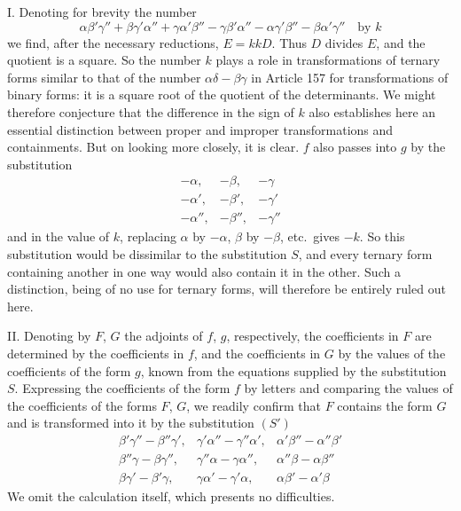 I. Denoting for brevity the number
\[
\alpha\beta'\gamma''+\beta\gamma'\alpha''+\gamma\alpha'\beta''
-\gamma\beta'\alpha''-\alpha\gamma'\beta''-\beta\alpha'\gamma''\quad\text{by }k
\]
we find, after the necessary reductions, $E=kkD$. Thus $D$ divides $E$, and the quotient is a square. So the number $k$ plays a role in transformations of ternary forms similar to that of the number $\alpha\delta-\beta\gamma$ in Article 157 for transformations of binary forms: it is a square root of the quotient of the determinants. We might therefore conjecture that the difference in the sign of $k$ also establishes here an essential distinction between proper and improper transformations and containments. But on looking more closely, it is clear. $f$ also passes into $g$ by the substitution
\[
\begin{array}{ccc}
-\alpha, & -\beta, & -\gamma \\
-\alpha', & -\beta', & -\gamma' \\
-\alpha'', & -\beta'', & -\gamma''
\end{array}
\]
and in the value of $k$, replacing $\alpha$ by $-\alpha$, $\beta$ by $-\beta$, etc.\ gives $-k$. So this substitution would be dissimilar to the substitution $S$, and every ternary form containing another in one way would also contain it in the other. Such a distinction, being of no use for ternary forms, will therefore be entirely ruled out here.

II. Denoting by $F$, $G$ the adjoints of $f$, $g$, respectively, the coefficients in $F$ are determined by the coefficients in $f$, and the coefficients in $G$ by the values of the coefficients of the form $g$, known from the equations supplied by the substitution $S$. Expressing the coefficients of the form $f$ by letters and comparing the values of the coefficients of the forms $F$, $G$, we readily confirm that $F$ contains the form $G$ and is transformed into it by the substitution
$(S')$
\[
\begin{array}{ccc}
\beta'\gamma''-\beta''\gamma', & \gamma'\alpha''-\gamma''\alpha', & \alpha'\beta''-\alpha''\beta' \\
\beta''\gamma-\beta\gamma'', & \gamma''\alpha-\gamma\alpha'', & \alpha''\beta-\alpha\beta'' \\
\beta\gamma'-\beta'\gamma, & \gamma\alpha'-\gamma'\alpha, & \alpha\beta'-\alpha'\beta
\end{array}
\]
We omit the calculation itself, which presents no difficulties.

